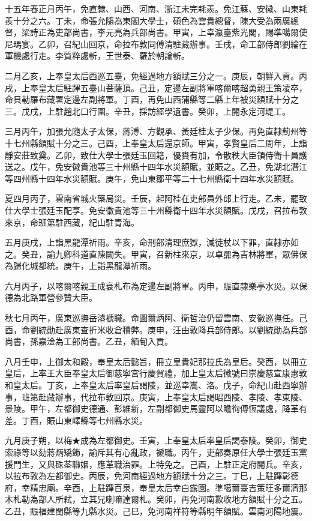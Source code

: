 \begin{pinyinscope}
十五年春正月丙午，免直隸、山西、河南、浙江未完耗羨。免江蘇、安徽、山東耗羨十分之六。丁未，命張允隨為東閣大學士，碩色為雲貴總督，陳大受為兩廣總督，梁詩正為吏部尚書，李元亮為兵部尚書。甲寅，上幸瀛臺紫光閣，賜準噶爾使尼瑪宴。乙卯，召紀山回京，命拉布敦同傅清駐藏辦事。壬戌，命工部侍郎劉綸在軍機處行走。李質粹處斬，王世泰、羅於朝論斬。

二月乙亥，上奉皇太后西巡五臺，免經過地方額賦三分之一。庚辰，朝鮮入貢。丙戌，上奉皇太后駐蹕五臺山菩薩頂。己丑，定邊左副將軍喀爾喀超勇親王策凌卒，命貝勒羅布藏署定邊左副將軍。丁酉，再免山西蒲縣等二縣上年被災額賦十分之三。戊戌，上駐趙北口行圍。辛丑，採訪經學遺書。癸卯，上閱永定河堤工。

三月丙午，加張允隨太子太保，蔣溥、方觀承、黃廷桂太子少保。再免直隸薊州等十七州縣額賦十分之三。己酉，上奉皇太后還京師。甲寅，孝賢皇后二周年，上詣靜安莊致奠。乙卯，致仕大學士張廷玉回籍，優賚有加，令散秩大臣領侍衛十員護送之。戊午，免安徽貴池等三十州縣十四年水災額賦，並賑之。乙丑，免湖北潛江等四州縣十四年水災額賦。庚午，免山東鄒平等二十七州縣衛十四年水災額賦。

夏四月丙子，雲南省城火藥局災。壬辰，起阿桂在吏部員外郎上行走。乙未，罷致仕大學士張廷玉配享。免安徽貴池等三十州縣衛十四年水災額賦。戊戌，召拉布敦來京，命班第駐西藏，紀山駐青海。

五月庚戌，上詣黑龍潭祈雨。辛亥，命刑部清理庶獄，減徒杖以下罪，直隸亦如之。癸丑，諭九卿科道直陳闕失。甲寅，召新柱來京，以卓鼐為吉林將軍，眾佛保為歸化城都統。庚午，上詣黑龍潭祈雨。

六月丙子，以喀爾喀親王成袞札布為定邊左副將軍。丙申，賑直隸樂亭水災。以保德為北路軍營參贊大臣。

秋七月丙午，廣東巡撫岳濬褫職。命圖爾炳阿、衛哲治仍留雲南、安徽巡撫任。己酉，命劉統勛赴廣東查折米收倉積弊。庚申，汪由敦降兵部侍郎。以劉統勛為兵部尚書，孫嘉淦為工部尚書。乙丑，緬甸入貢。

八月壬申，上御太和殿，奉皇太后懿旨，冊立皇貴妃那拉氏為皇后。癸酉，以冊立皇后，上率王大臣奉皇太后御慈寧宮行慶賀禮，加上皇太后徽號曰崇慶慈宣康惠敦和皇太后。丁亥，上奉皇太后率皇后謁陵，並巡幸嵩、洛。戊子，命紀山赴西寧辦事，班第赴藏辦事，代拉布敦回京。庚寅，上奉皇太后謁昭西陵、孝陵、孝東陵、景陵。甲午，左都御史德通、彭維新，左副都御史馬靈阿以瞻徇傅恆議處，降革有差。丁酉，賑山東嶧縣等七州縣水災。

九月庚子朔，以梅★成為左都御史。壬寅，上奉皇太后率皇后謁泰陵。癸卯，御史索祿等以劾蔣炳矯飾，諭斥其有心亂政，褫職。丙午，吏部奏原任大學士張廷玉黨援門生，又與硃荃聯姻，應革職治罪。上特免之。己酉，上駐正定府閱兵。辛亥，以拉布敦為左都御史。丙辰，免河南經過地方額賦十分之三。丁巳，上駐蹕彰德府，幸精忠廟。辛酉，上駐蹕百泉，奉皇太后幸白露園。準噶爾臺吉策旺多爾濟那木札勒為部人所弒，立其兄喇嘛達爾札。癸卯，再免河南歉收地方額賦十分之五。乙丑，賑福建閩縣等九縣水災。己巳，免河南祥符等縣明年額賦。雲南河陽地震。


\end{pinyinscope}
